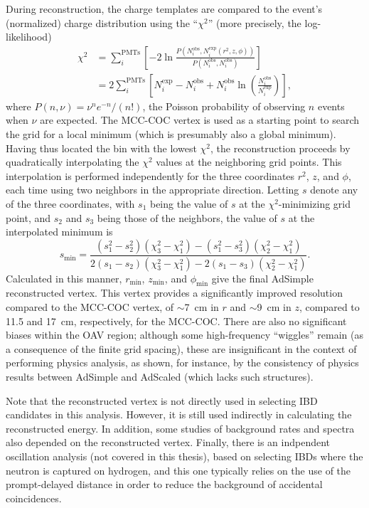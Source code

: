 \documentclass[../thesis.tex]{subfiles}
\begin{document}
\newcommand\Niobs{N_i^{\mathrm{obs}}} \newcommand\Niexp{N_i^{\mathrm{exp}}}

During reconstruction, the charge templates are compared to the event's
(normalized) charge distribution using the ``$\chi^2$'' (more precisely, the
log-likelihood)
\begin{align*}
  \chi^2 &= \sum_i^{\mathrm{PMTs}}\left[ -2 \ln \frac{P(\Niobs, \Niexp(r^2, z, \phi))}
           {P(\Niobs, \Niobs)} \right] \\
         &= 2 \sum_i^{\mathrm{PMTs}} \left[ \Niexp - \Niobs+ \Niobs \ln \left( \frac{\Niobs}{\Niexp} \right) \right],
\end{align*}
where $P(n, \nu) = \nu^n e^{-n} / (n!)$, the Poisson probability of observing
$n$ events when $\nu$ are expected. The MCC-COC vertex is used as a starting
point to search the grid for a local minimum (which is presumably also a global
minimum). Having thus located the bin with the lowest $\chi^2$, the
reconstruction proceeds by quadratically interpolating the $\chi^2$ values at
the neighboring grid points. This interpolation is performed independently for
the three coordinates $r^2$, $z$, and $\phi$, each time using two neighbors in
the appropriate direction. Letting $s$ denote any of the three coordinates, with
$s_1$ being the value of $s$ at the $\chi^2$-minimizing grid point, and $s_2$
and $s_3$ being those of the neighbors, the value of $s$ at the interpolated
minimum is
\begin{equation*}
  s_{\mathrm{min}} = \frac{(s_1^2 - s_2^2)(\chi_3^2 - \chi_1^2) - (s_1^2 - s_3^2)(\chi_2^2 - \chi_1^2)}{2(s_1 - s_2)(\chi_3^2 - \chi_1^2) - 2(s_1 - s_3)(\chi_2^2 - \chi_1^2)}.
\end{equation*}
Calculated in this manner, $r_{\mathrm{min}}$, $z_{\mathrm{min}}$, and
$\phi_{\mathrm{min}}$ give the final AdSimple reconstructed vertex. This vertex
provides a significantly improved resolution compared to the MCC-COC vertex, of
$\sim$7~cm in $r$ and $\sim$9~cm in $z$, compared to 11.5 and 17~cm,
respectively, for the MCC-COC. There are also no significant biases within the
OAV region; although some high-frequency ``wiggles'' remain (as a consequence of
the finite grid spacing), these are insignificant in the context of performing
physics analysis, as shown, for instance, by the consistency of physics results
between AdSimple and AdScaled (which lacks such structures).

Note that the reconstructed vertex is not directly used in selecting IBD
candidates in this analysis. However, it is still used indirectly in calculating
the reconstructed energy. In addition, some studies of background rates and
spectra also depended on the reconstructed vertex. Finally, there is an
indpendent oscillation analysis (not covered in this thesis), based on selecting
IBDs where the neutron is captured on hydrogen, and this one typically relies on
the use of the prompt-delayed distance in order to reduce the background of
accidental coincidences.
\end{document}
